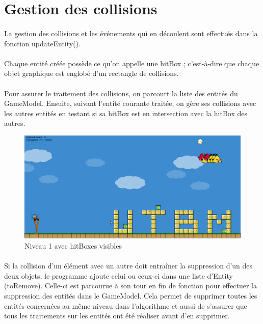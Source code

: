 \documentclass[a4paper,12pt]{report}
\begin{document}
\section{Gestion des collisions}

\paragraph{}La gestion des collisions et les événements qui en découlent sont effectués dans la fonction updateEntity().

\paragraph{}Chaque entité créée possède ce qu'on appelle une hitBox ; c'est-à-dire que chaque objet graphique est englobé d'un rectangle de collisions. 

\paragraph{}Pour assurer le traitement des collisions, on parcourt la liste des entités du GameModel. Ensuite, suivant l'entité courante traitée, on gère ses collisions avec les autres entités en testant si sa hitBox est en intersection avec la hitBox des autres.

\begin{figure}[H]
\begin{center}
\includegraphics[scale=0.4]{images/lvl01hitbox.png} 
\end{center}
\caption{Niveau 1 avec hitBoxes visibles}
\label{Niveau 1 avec hitBoxes visibles}
\end{figure}

\paragraph{}Si la collision d'un élément avec un autre doit entraîner la suppression d'un des deux objets, le programme ajoute celui ou ceux-ci dans une liste d'Entity (toRemove). Celle-ci est parcourue à son tour en fin de fonction pour effectuer la suppression des entités dans le GameModel. Cela permet de supprimer toutes les entités concernées au même niveau dans l'algorithme et aussi de s'assurer que tous les traitements sur les entités ont été réaliser avant d'en supprimer.
\end{document}
